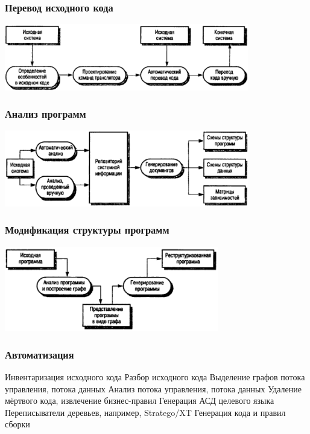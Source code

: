 \documentclass{../../slides-style}
\begin{document}
    \begin{frame}
        \frametitle{Перевод исходного кода}
        \begin{center}
            \includegraphics[width=0.8\textwidth]{sourceCodeTranslation.png}
        \end{center}
    \end{frame}

    \begin{frame}
        \frametitle{Анализ программ}
        \begin{center}
            \includegraphics[width=0.8\textwidth]{programStructureAnalysis.png}
        \end{center}
    \end{frame}

    \begin{frame}
        \frametitle{Модификация структуры программ}
        \begin{center}
            \includegraphics[width=0.7\textwidth]{programStructureReengineering.png}
        \end{center}
    \end{frame}

    \begin{frame}
        \frametitle{Автоматизация}
        \begin{outline}
            \1 Инвентаризация исходного кода
            \1 Разбор исходного кода
            \1 Выделение графов потока управления, потока данных
            \1 Анализ потока управления, потока данных
            \1 Удаление мёртвого кода, извлечение бизнес-правил
            \1 Генерация АСД целевого языка
                \2 Переписыватели деревьев, например, Stratego/XT
            \1 Генерация кода и правил сборки
        \end{outline}
    \end{frame}
\end{document}
